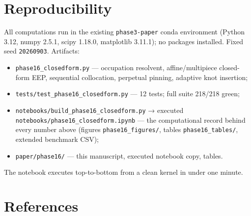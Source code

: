 \documentclass[
  english,
  10pt,
  letterpaper,
  DIV=11,
  numbers=noendperiod]{scrartcl}
\providecommand{\tightlist}{%
  \setlength{\itemsep}{0pt}\setlength{\parskip}{0pt}}
\begin{document}
\section{Reproducibility}\label{sec-repro}

All computations run in the existing \texttt{phase3-paper} conda
environment (Python 3.12, numpy 2.5.1, scipy 1.18.0, matplotlib 3.11.1);
no packages installed. Fixed seed \texttt{20260903}. Artifacts:

\begin{itemize}
\tightlist
\item
  \texttt{phase16\_closedform.py} --- occupation resolvent,
  affine/multipiece closed-form EEP, sequential collocation, perpetual
  pinning, adaptive knot insertion;
\item
  \texttt{tests/test\_phase16\_closedform.py} --- 12 tests; full suite
  218/218 green;
\item
  \texttt{notebooks/build\_phase16\_closedform.py} → executed
  \texttt{notebooks/phase16\_closedform.ipynb} --- the computational
  record behind every number above (figures \texttt{phase16\_figures/},
  tables \texttt{phase16\_tables/}, extended benchmark CSV);
\item
  \texttt{paper/phase16/} --- this manuscript, executed notebook copy,
  tables.
\end{itemize}

The notebook executes top-to-bottom from a clean kernel in under one
minute.

\section*{References}\label{references}
\end{document}
